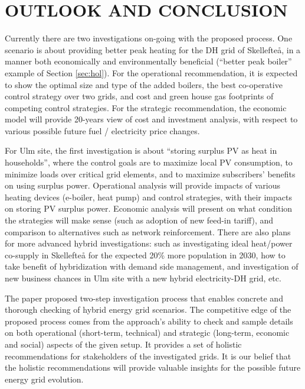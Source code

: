 \documentclass[a4paper,twoside]{article}
\begin{document}
\section{\uppercase{Outlook and Conclusion}}
\label{sec:con} 
\noindent
Currently there are two investigations on-going with the proposed 
process. One scenario is about providing better peak heating for the
DH grid of Skellefte{\aa}, in a manner both economically and
environmentally beneficial (``better peak boiler'' example of Section
\ref{sec:hol}). 
For the operational recommendation, it is expected to show the optimal
size and type of the added boilers, the best co-operative control
strategy over two grids, and cost and green house gas footprints
of competing control strategies. For the strategic recommendation, the
economic model will provide 20-years view of cost and investment
analysis, with respect to various possible future fuel / electricity
price changes. 

For Ulm site, the first investigation is about ``storing surplus PV as 
heat in households'', where the control goals are to maximize local 
PV consumption, to minimize loads over critical grid elements, and to 
maximize subscribers' benefits on using surplus power. Operational
analysis will provide impacts of various heating devices (e-boiler, 
heat pump) and control strategies, with their impacts on storing PV
surplus power. Economic analysis will present on what condition the 
strategies will make sense (such as adoption of new feed-in tariff),
and comparison to alternatives such as network reinforcement.  
There are also plans for more advanced hybrid investigations: such as  
investigating ideal heat/power co-supply in Skellefte{\aa} for the 
expected 20\% more population in 2030, how to take benefit of  
hybridization with demand side management, and investigation of new
business chances in Ulm site with a new hybrid electricity-DH grid, 
etc.

The paper proposed two-step investigation process that enables
concrete and thorough checking of hybrid energy grid scenarios. The
competitive edge of the proposed process comes from the approach's
ability to check and  sample details on both operational
(short-term, technical) and strategic (long-term, economic and
social) aspects of the given setup. It provides a set of holistic
recommendations for stakeholders of the investigated grids. It is our 
belief that the holistic recommendations will provide valuable
insights for the possible future energy grid evolution.
\end{document}
